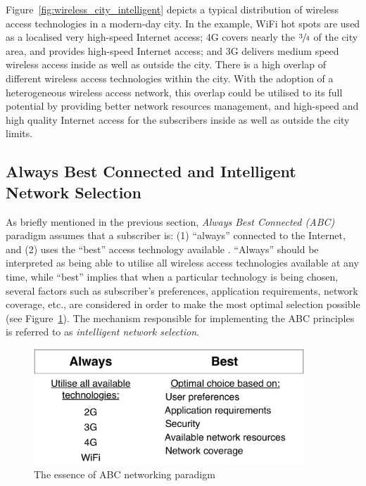 Figure~\ref{fig:wireless_city_intelligent} depicts a typical distribution of wireless access technologies in a modern-day city. In the example, WiFi hot spots are used as a localised very high-speed Internet access; 4G covers nearly the $\sfrac{3}{4}$ of the city area, and provides high-speed Internet access; and 3G delivers medium speed wireless access inside as well as outside the city. There is a high overlap of different wireless access technologies within the city. With the adoption of a heterogeneous wireless access network, this overlap could be utilised to its full potential by providing better network resources management, and high-speed and high quality Internet access for the subscribers inside as well as outside the city limits.

\subsection{Always Best Connected and Intelligent Network Selection} %
\label{sub:always_best_connected_and_intelligent_network_selection_intelligent}
As briefly mentioned in the previous section, \emph{Always Best Connected (ABC)} paradigm assumes that a subscriber is: (1) ``always'' connected to the Internet, and (2) uses the ``best'' access technology available \cite{ABC03}. ``Always'' should be interpreted as being able to utilise all wireless access technologies available at any time, while ``best'' implies that when a particular technology is being chosen, several factors such as subscriber's preferences, application requirements, network coverage, etc., are considered in order to make the most optimal selection possible (see Figure~\ref{fig:abc_intelligent}). The mechanism responsible for implementing the ABC principles is referred to as \emph{intelligent network selection}.

\begin{figure}[t]
    \centering
    \includegraphics[width=4in]{Intelligent/Figures/abc}
    \caption{The essence of ABC networking paradigm}
    \label{fig:abc_intelligent}
\end{figure}

